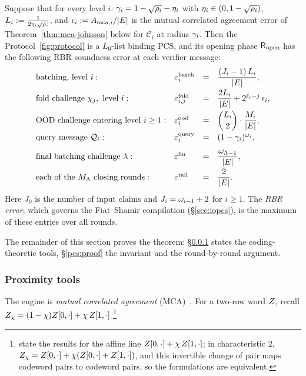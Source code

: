 \begin{theorem}\label{thm:rbr}
Suppose that for every level $i$: $\gamma_i = 1 - \sqrt{\rho_i} - \eta_i$ with $\eta_i \in (0, 1-\sqrt{\rho_i})$, $L_i := \tfrac{1}{2\eta_i\sqrt{\rho_i}}$, and $\epsilon_i := A_{\mathrm{mca},i}/|E|$ is the mutual correlated agreement error of Theorem~\ref{thm:mca-johnson} below for $\mathcal{C}_i$ at radius $\gamma_i$. Then the Protocol~\ref{fig:protocol} is a $L_0$-list binding PCS, and its opening phase $\mathsf{R}_{\mathrm{open}}$ has the following RBR soundness error at each verifier message:
\[
\begin{array}{llcl}
\textnormal{batching, level } i: & \varepsilon^{\mathrm{batch}}_i &=& \dfrac{(J_i - 1)\, L_i}{|E|} , \\[2ex]
\textnormal{fold challenge } \chi_j, \textnormal{ level } i: & \varepsilon^{\mathrm{fold}}_{i,j} &=& \dfrac{2 L_i}{|E|} + 2^{\ell_i - j}\, \epsilon_i , \\[2ex]
\textnormal{OOD challenge entering level } i \ge 1: & \varepsilon^{\mathrm{ood}}_i &=& \dbinom{L_i}{2} \cdot \dfrac{M_i}{|E|} , \\[2ex]
\textnormal{query message } \mathcal{Q}_i: & \varepsilon^{\mathrm{query}}_i &=& (1 - \gamma_i)^{\omega_i} , \\[2ex]
\textnormal{final batching challenge } \lambda: & \varepsilon^{\mathrm{fin}} &=& \dfrac{\omega_{\Lambda-1}}{|E|} , \\[2ex]
\textnormal{each of the } M_\Lambda \textnormal{ closing rounds}: & \varepsilon^{\mathrm{tail}} &=& \dfrac{2}{|E|} .
\end{array}
\]
Here $J_0$ is the number of input claims and $J_i = \omega_{i-1} + 2$ for $i \ge 1$. The \emph{RBR error}, which governs the Fiat--Shamir compilation (\S\ref{sec:iopcs}), is the maximum of these entries over all rounds.
\end{theorem}

The remainder of this section proves the theorem: \S\ref{sec:tools} states the coding-theoretic tools, \S\ref{pcs:proof} the invariant and the round-by-round argument.

\subsubsection{Proximity tools}\label{sec:tools}

The engine is \emph{mutual correlated agreement} (MCA)~\cite{ACFY25}. For a two-row word $Z$, recall $Z_\chi = (1-\chi)Z[0,\cdot] + \chi\,Z[1,\cdot]$.\footnote{\cite{BCHKS25} state the results for the affine line $Z[0,\cdot] + \chi\,Z[1,\cdot]$; in characteristic $2$, $Z_\chi = Z[0,\cdot] + \chi(Z[0,\cdot] + Z[1,\cdot])$, and this invertible change of pair maps codeword pairs to codeword pairs, so the formulations are equivalent.}

